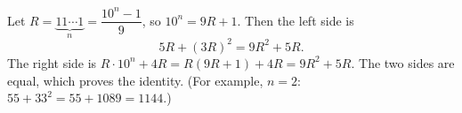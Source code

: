 Let $R=\underbrace{11\cdots1}_{n}=\dfrac{10^n-1}{9}$, so $10^n=9R+1$. Then the left side is
\[
5R+(3R)^2=9R^2+5R .
\]
The right side is $R\cdot10^n+4R=R(9R+1)+4R=9R^2+5R$. The two sides are equal, which proves the identity. (For example, $n=2$: $55+33^2=55+1089=1144$.)
